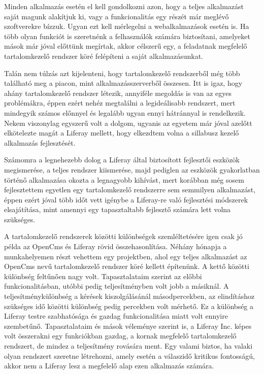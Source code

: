 \documentclass[hidelinks, 12pt, a4paper]{report}
\begin{document}
Minden alkalmazás esetén el kell gondolkozni azon, hogy a teljes alkalmazást saját magunk alakítjuk ki, vagy a funkcionalitás egy részét már meglévő szoftverekre bízzuk. Ugyan ezt kell mérlegelni a webalkalmazások esetén is. Ha több olyan funkciót is szeretnénk a felhasználók számára biztosítani, amelyeket mások már jóval előttünk megírtak, akkor célszerű egy, a feladatnak megfelelő tartalomkezelő rendszer köré felépíteni a saját alkalmazásunkat.

Talán nem túlzás azt kijelenteni, hogy tartalomkezelő rendszerből még több található meg a piacon, mint alkalmazásszerverből összesen. Itt is igaz, hogy ahány tartalomkezelő rendszer létezik, annyiféle megoldás is van az egyes problémákra, éppen ezért nehéz megtalálni a legideálisabb rendszert, mert mindegyik számos előnnyel és legalább ugyan ennyi hátránnyal is rendelkezik. Nekem viszonylag egyszerű volt a dolgom, ugyanis az egyetem már jóval azelőtt elkötelezte magát a Liferay mellett, hogy elkezdtem volna a sillabusz kezelő alkalmazás fejlesztését.

Számomra a legnehezebb dolog a Liferay által biztosított fejlesztői eszközök megismerése, a teljes rendszer kiismerése, majd pediglen az eszközök gyakorlatban történő alkalmazása okozta a legnagyobb kihívást, mert korábban még sosem fejlesztettem egyetlen egy tartalomkezelő rendszerre sem semmilyen alkalmazást, éppen ezért jóval több időt vett igénybe a Liferay-re való fejlesztési módszerek elsajátítása, mint amennyi egy tapasztaltabb fejlesztő számára lett volna szükséges.

A tartalomkezelő rendszerek közötti különbségek szemléltetésére igen csak jó példa az OpenCms és Liferay rövid összehasonlítása. Néhány hónapja a munkahelyemen részt vehettem egy projektben, ahol egy teljes alkalmazást az OpenCms nevű tartalomkezelő rendszer köré kellett építenünk. A kettő közötti különbség feltűnően nagy volt. Tapasztalataim szerint az előbbi funkcionalitásban, utóbbi pedig teljesítményben volt jobb a másiknál. A teljesítménykülönbség a kérések kiszolgálásánál másodpercekben, az elindításhoz szükséges idő közötti különbség pedig percekben volt mérhető. Ez a különbség a Liferay testre szabhatósága és gazdag funkcionalitása miatt volt ennyire szembetűnő. Tapasztalataim és mások véleménye szerint is, a Liferay Inc. képes volt összerakni egy funkciókban gazdag, a kornak megfelelő tartalomkezelő rendszert, de mindez a teljesítmény rovására ment. Egy valami biztos, ha valaki olyan rendszert szeretne létrehozni, amely esetén a válaszidő kritikus fontosságú, akkor nem a Liferay lesz a megfelelő alap ezen alkalmazás számára.
\end{document}
